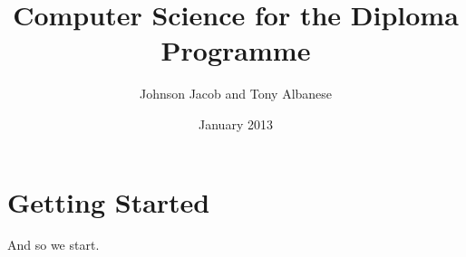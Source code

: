 \documentclass[a4paper,12pt]{book}
\begin{document}
\author{Johnson Jacob and Tony Albanese}
\title{Computer Science for the Diploma Programme}
\date{January 2013}

\frontmatter
\maketitle
\tableofcontents

\mainmatter

\chapter{Getting Started}

And so we start.
%
%

\backmatter
\end{document}
